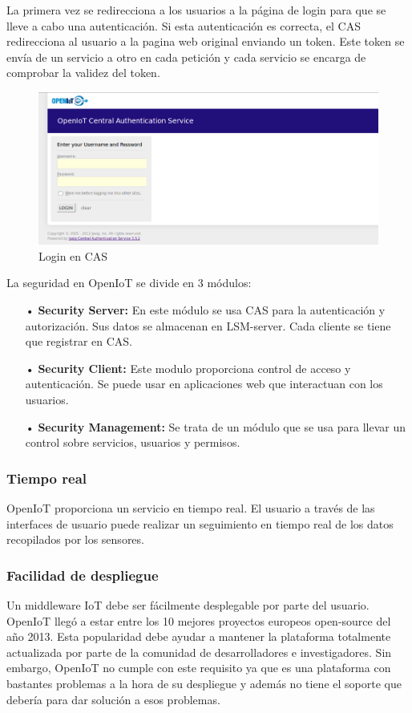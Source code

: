 \documentclass[12pt, twoside]{book}
\begin{document}
La primera vez se redirecciona a los usuarios a la página de login para que se lleve a cabo una autenticación. Si esta autenticación es correcta, el CAS redirecciona al usuario a la pagina web original enviando un token. Este token se envía de un servicio a otro en cada petición y cada servicio se encarga de comprobar la validez del token.
\begin{figure}[H]
\centering
\includegraphics[scale=0.5]{images/login_capture}
\caption{Login en CAS}\label{L410}
\end{figure}
La seguridad en OpenIoT se divide en 3 módulos:
\begin{itemize}
\item[•]\textbf{Security Server:} En este módulo se usa CAS para la autenticación y autorización. Sus datos se almacenan en LSM-server. Cada cliente se tiene que registrar en CAS.
\item[•] \textbf{Security Client:} Este modulo proporciona control de acceso y autenticación. Se puede usar en aplicaciones web que interactuan con los usuarios.  
\item[•] \textbf{Security Management:} Se trata de un módulo que se usa para llevar un control sobre servicios, usuarios y permisos.
\end{itemize}
  
\subsubsection*{Tiempo real}
OpenIoT proporciona un servicio en tiempo real. El usuario a través de las interfaces de usuario puede realizar un seguimiento en tiempo real de los datos recopilados por los sensores.

\subsubsection*{Facilidad de despliegue}
Un middleware IoT debe ser fácilmente desplegable por parte del usuario. OpenIoT llegó a estar entre los 10 mejores proyectos europeos open-source del año 2013. Esta popularidad debe ayudar a mantener la plataforma totalmente actualizada por parte de la comunidad de desarrolladores e investigadores. Sin embargo, OpenIoT no cumple con este requisito ya que es una plataforma con bastantes problemas a la hora de su despliegue y además no tiene el soporte que debería para dar solución a esos problemas.
\end{document}
